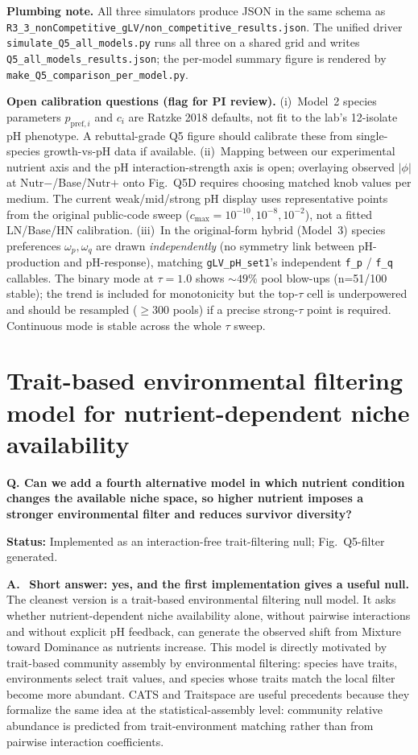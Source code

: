 \documentclass[11pt]{article}
\newcommand{\question}[1]{%
    \par\vspace{0.4em}\noindent%
    {\color{blue!70!black}\textbf{Q. #1}}\par\smallskip%
}
\newcommand{\answerlabel}{\par\noindent\textbf{A.}\ }
\newcommand{\statusmark}[1]{{\color{red!70!black}\textbf{Status:} #1}\par}
\begin{document}
\noindent\textbf{Plumbing note.} All three simulators produce JSON in the same schema as \texttt{R3\_3\_nonCompetitive\_gLV/non\_competitive\_results.json}. The unified driver \texttt{simulate\_Q5\_all\_models.py} runs all three on a shared grid and writes \texttt{Q5\_all\_models\_results.json}; the per-model summary figure is rendered by \texttt{make\_Q5\_comparison\_per\_model.py}.

\noindent\textbf{Open calibration questions (flag for PI review).}
(i)~Model~2 species parameters $p_{\mathrm{pref},i}$ and $c_i$ are Ratzke 2018 defaults, not fit to the lab's 12-isolate pH phenotype. A rebuttal-grade Q5 figure should calibrate these from single-species growth-vs-pH data if available.
(ii)~Mapping between our experimental nutrient axis and the pH interaction-strength axis is open; overlaying observed $|\phi|$ at Nutr$-$/Base/Nutr$+$ onto Fig.~Q5D requires choosing matched knob values per medium. The current weak/mid/strong pH display uses representative points from the original public-code sweep ($c_{\max}=10^{-10},10^{-8},10^{-2}$), not a fitted LN/Base/HN calibration.
(iii)~In the original-form hybrid (Model~3) species preferences $\omega_p, \omega_q$ are drawn \emph{independently} (no symmetry link between pH-production and pH-response), matching \texttt{gLV\_pH\_set1}'s independent \texttt{f\_p} / \texttt{f\_q} callables. The binary mode at $\tau=1.0$ shows $\sim 49\%$ pool blow-ups (n=51/100 stable); the trend is included for monotonicity but the top-$\tau$ cell is underpowered and should be resampled ($\ge 300$ pools) if a precise strong-$\tau$ point is required. Continuous mode is stable across the whole $\tau$ sweep.

\section{Trait-based environmental filtering model for nutrient-dependent niche availability}
\label{sec:q5_trait_filtering}

\question{Can we add a fourth alternative model in which nutrient condition changes the available niche space, so higher nutrient imposes a stronger environmental filter and reduces survivor diversity?}
\statusmark{Implemented as an interaction-free trait-filtering null; Fig.~Q5-filter generated.}

\answerlabel
\textbf{Short answer: yes, and the first implementation gives a useful null.} The cleanest version is a trait-based environmental filtering null model. It asks whether nutrient-dependent niche availability alone, without pairwise interactions and without explicit pH feedback, can generate the observed shift from Mixture toward Dominance as nutrients increase. This model is directly motivated by trait-based community assembly by environmental filtering: species have traits, environments select trait values, and species whose traits match the local filter become more abundant. CATS and Traitspace are useful precedents because they formalize the same idea at the statistical-assembly level: community relative abundance is predicted from trait-environment matching rather than from pairwise interaction coefficients.
\end{document}
